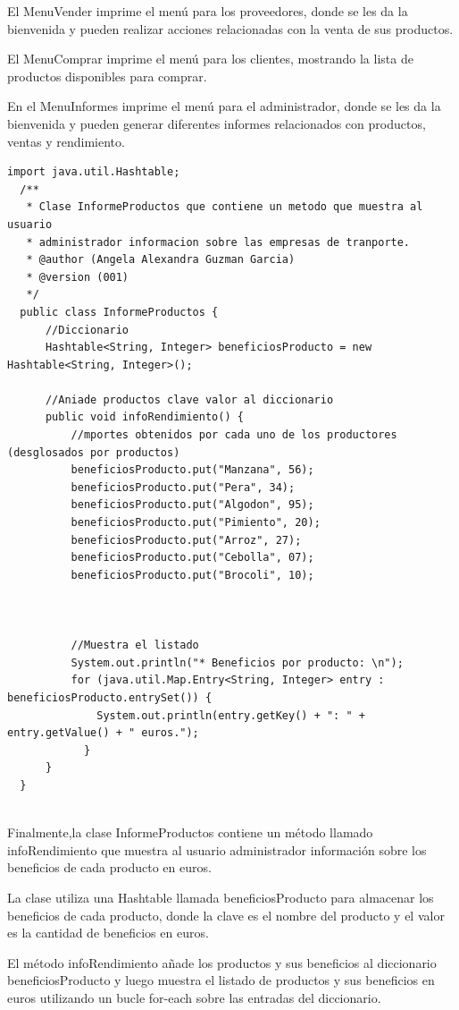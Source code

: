 \documentclass[10pt,a4paper]{article}
\def\StartLineAt#1{\lstset{firstnumber=#1}}
\begin{document}
El MenuVender imprime el menú para los proveedores, donde se les da la bienvenida y pueden realizar acciones relacionadas con la venta de sus productos.

El MenuComprar imprime el menú para los clientes, mostrando la lista de productos disponibles para comprar.

En el MenuInformes imprime el menú para el administrador, donde se les da la bienvenida y pueden generar diferentes informes relacionados con productos, ventas y rendimiento.


\StartLineAt{28}
\begin{lstlisting}[style=Java]
  import java.util.Hashtable;
  /**
   * Clase InformeProductos que contiene un metodo que muestra al usuario
   * administrador informacion sobre las empresas de tranporte.
   * @author (Angela Alexandra Guzman Garcia) 
   * @version (001)
   */
  public class InformeProductos {
      //Diccionario  
      Hashtable<String, Integer> beneficiosProducto = new Hashtable<String, Integer>();
  
      //Aniade productos clave valor al diccionario 
      public void infoRendimiento() {
          //mportes obtenidos por cada uno de los productores (desglosados por productos)
          beneficiosProducto.put("Manzana", 56);
          beneficiosProducto.put("Pera", 34);
          beneficiosProducto.put("Algodon", 95);
          beneficiosProducto.put("Pimiento", 20);
          beneficiosProducto.put("Arroz", 27);
          beneficiosProducto.put("Cebolla", 07);
          beneficiosProducto.put("Brocoli", 10);
          
      
          
          //Muestra el listado 
          System.out.println("* Beneficios por producto: \n");
          for (java.util.Map.Entry<String, Integer> entry : beneficiosProducto.entrySet()) {
              System.out.println(entry.getKey() + ": " + entry.getValue() + " euros.");
            }
      }
  }
  
\end{lstlisting}

Finalmente,la clase InformeProductos contiene un método llamado infoRendimiento que muestra al usuario administrador información sobre los beneficios de cada producto en euros.

La clase utiliza una Hashtable llamada beneficiosProducto para almacenar los beneficios de cada producto, donde la clave es el nombre del producto y el valor es la cantidad de beneficios en euros.

El método infoRendimiento añade los productos y sus beneficios al diccionario beneficiosProducto y luego muestra el listado de productos y sus beneficios en euros utilizando un bucle for-each sobre las entradas del diccionario.








  
 
\end{document}

